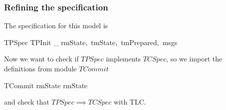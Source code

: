 \begin{frame}
    \frametitle{Refining the specification}

    The specification for this model is
    \begin{tlabox}
        TPSpec  TPInit \land \Box [TPNext\,]_{\langle
        rmState,\, tmState,\, tmPrepared,\, msgs \rangle}
    \end{tlabox}

    Now we want to check if $TPSpec$ implements $TCSpec$, so we import the
    definitions from module $TCommit$
    \begin{tlabox}
        \INSTANCE TCommit \textcolor{gray!50}{\WITH rmState \leftarrow rmState}
    \end{tlabox}
    and check that \alert{$TPSpec \implies TCSpec$} with TLC.

    \begin{center}
        \scriptsize
    \end{center}

\end{frame}

